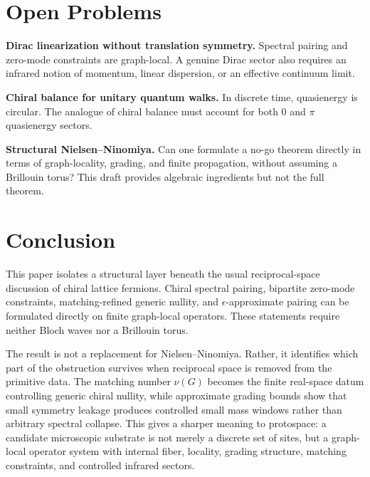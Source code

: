 \documentclass[11pt,a4paper]{article}
\begin{document}
\section{Open Problems}

\begin{description}[leftmargin=1.2cm,style=nextline]
\item[E1] \textbf{Dirac linearization without translation symmetry.}
Spectral pairing and zero-mode constraints are graph-local. A genuine Dirac
sector also requires an infrared notion of momentum, linear dispersion, or an
effective continuum limit.

\item[E2] \textbf{Chiral balance for unitary quantum walks.}
In discrete time, quasienergy is circular. The analogue of chiral balance must
account for both $0$ and $\pi$ quasienergy sectors.

\item[E3] \textbf{Structural Nielsen--Ninomiya.}
Can one formulate a no-go theorem directly in terms of graph-locality, grading,
and finite propagation, without assuming a Brillouin torus? This draft provides
algebraic ingredients but not the full theorem.
\end{description}

\section{Conclusion}

This paper isolates a structural layer beneath the usual reciprocal-space
discussion of chiral lattice fermions. Chiral spectral pairing, bipartite
zero-mode constraints, matching-refined generic nullity, and
$\epsilon$-approximate pairing can be formulated directly on finite
graph-local operators. These statements require neither Bloch waves nor a
Brillouin torus.

The result is not a replacement for Nielsen--Ninomiya. Rather, it identifies
which part of the obstruction survives when reciprocal space is removed from
the primitive data. The matching number $\nu(G)$ becomes the finite real-space
datum controlling generic chiral nullity, while approximate grading bounds
show that small symmetry leakage produces controlled small mass windows rather
than arbitrary spectral collapse. This gives a sharper meaning to protospace:
a candidate microscopic substrate is not merely a discrete set of sites, but a
graph-local operator system with internal fiber, locality, grading structure,
matching constraints, and controlled infrared sectors.
\end{document}
